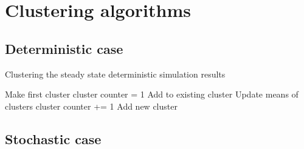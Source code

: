 
\section{Clustering algorithms}
\subsection{Deterministic case}
\begin{algorithm}
\label{alg:DetClustering}
  \caption{Clustering the steady state deterministic simulation results}
 \begin{algorithmic}[1]
    \Statex
      		\State Make first cluster
      		\State cluster counter = 1
      	\Else
      					\State Add to existing cluster
      					\State Update means of clusters
      			\EndIf
      				\State cluster counter +=  1
      				\State Add new cluster
      			\EndIf
      		\EndFor
      	\EndIf
      \EndFor
  \end{algorithmic}
\end{algorithm}


\subsection{Stochastic case}
